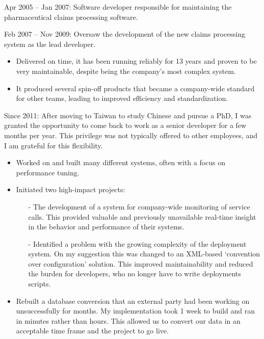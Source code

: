 \documentclass[10pt,a4paper]{../altacv}
\begin{document}
Apr 2005 -- Jan 2007: Software developer responsible for maintaining the pharmaceutical claims processing software.

\medskip

Feb 2007 -- Nov 2009: Oversaw the development of the new claims processing system as the lead developer.

\medskip

\begin{itemize}
	\item Delivered on time, it has been running reliably for 13 years and proven to be very maintainable, despite being the company's most complex system.
	\item It produced several spin-off products that became a company-wide standard for other teams, leading to improved efficiency and standardization.
\end{itemize}

\medskip

Since 2011: After moving to Taiwan to study Chinese and pursue a PhD, I was granted the opportunity to come back to work as a senior developer for a few months per year. This privilege was not typically offered to other employees, and I am grateful for this flexibility.


\medskip

\begin{itemize}
	\item Worked on and built many different systems, often with a focus on performance tuning.
	\item Initiated two high-impact projects:
	\begin{itemize}
		\item[-] The development of a system for company-wide monitoring of service calls. This provided valuable and previously unavailable real-time insight in the behavior and performance of their systems.
		\item[-] Identified a problem with the growing complexity of the deployment system. On my suggestion this was changed to an XML-based ‘convention over configuration' solution. This improved maintainability and reduced the burden for developers, who no longer have to write deployments scripts.
	\end{itemize}
	\item Rebuilt a database conversion that an external party had been working on unsuccessfully for months. My implementation took 1 week to build and ran in minutes rather than hours. This allowed us to convert our data in an acceptable time frame and the project to go live.
\end{itemize}
\end{document}
